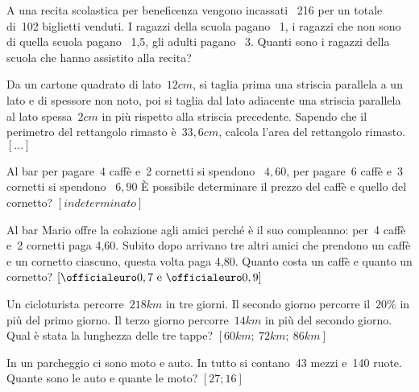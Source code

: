 \begin{multicols}{2}
\begin{esercizio}
 \label{ese:22.91}
A una recita scolastica per beneficenza vengono incassati
{\officialeuro}~216 per un totale di~102 biglietti venduti. I ragazzi della
scuola pagano {\officialeuro}~1, i ragazzi che non sono di quella scuola
pagano {\officialeuro}~1,5, gli adulti pagano {\officialeuro}~3. Quanti sono i
ragazzi della scuola che hanno assistito alla recita?
\end{esercizio}


\begin{esercizio}
 \label{ese:22.92}
Da un cartone quadrato di lato~\(12\unit{cm}\), si taglia prima una striscia
parallela a un lato e di spessore non noto, poi si taglia dal lato
adiacente una striscia parallela al lato spessa~\(2\unit{cm}\) in più rispetto
alla striscia precedente. Sapendo che il perimetro del rettangolo
rimasto è~\(33,6\unit{cm}\), calcola l'area del rettangolo rimasto.
\hfill \(\left[...\right]\)
\end{esercizio}

\begin{esercizio}[\Ast]
 \label{ese:22.93}
Al bar per pagare~4 caffè e~2 cornetti si spendono {\officialeuro}~\(4,60\), per 
pagare~6 caffè
e~3 cornetti si spendono {\officialeuro}~\(6,90\) È possibile
determinare il prezzo del caffè e quello del cornetto?
\hfill \(\left[indeterminato\right]\)
\end{esercizio}

\begin{esercizio}[\Ast]
 \label{ese:22.94}
 Al bar Mario offre la colazione agli amici perché è il suo
compleanno: per~4 caffè e~2 cornetti paga {\officialeuro}4,60. Subito dopo
arrivano tre altri amici che prendono un caffè e un cornetto
ciascuno, questa volta paga {\officialeuro}4,80. Quanto costa un caffè e
quanto un cornetto?
\hfill \(\left[\officialeuro 0,7 \text{ e } \officialeuro 0,9\right]\)
\end{esercizio}

\begin{esercizio}[\Ast]
 \label{ese:22.95}
Un cicloturista percorre~\(218\unit{km}\) in tre giorni. Il secondo giorno 
percorre
il~\(20\%\) in più del primo giorno. Il terzo giorno percorre~\(14\unit{km}\) in
più del secondo giorno. Qual è stata la lunghezza delle tre tappe?
\hfill \(\left[60\unit{km};~72\unit{km};~86\unit{km}\right]\)
\end{esercizio}

\begin{esercizio}[\Ast]
 \label{ese:22.96}
In un parcheggio ci sono moto e auto. In tutto si contano~43 mezzi e~140
ruote. Quante sono le auto e quante le moto?
\hfill \(\left[27; 16\right]\)
\end{esercizio}


\end{multicols}
